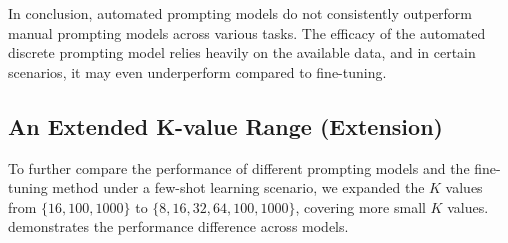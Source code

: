 In conclusion, automated prompting models do not consistently outperform manual prompting models across various tasks. The efficacy of the automated discrete prompting model relies heavily on the available data, and in certain scenarios, it may even underperform compared to fine-tuning.



\subsection{An Extended K-value Range (Extension)} \label{sec:eval_more_k}
To further compare the performance of different prompting models and the fine-tuning method under a few-shot learning scenario, we expanded the $K$ values from $\{16, 100, 1000\}$ to $\{8, 16, 32, 64, 100, 1000\}$, covering more small $K$ values.  demonstrates the performance difference across models. 

